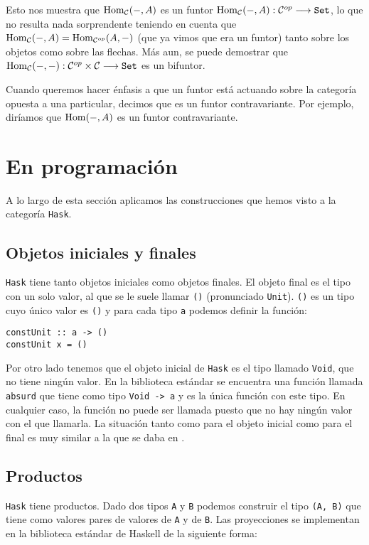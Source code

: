 Esto nos muestra que $\operatorname{Hom}_{\mathcal{C}}(-, A)$ es un funtor
$\operatorname{Hom}_{\mathcal{C}}(-, A) : \mathcal{C}^{op}\longrightarrow \texttt{Set}$, lo que no resulta
nada sorprendente teniendo en cuenta que
$\operatorname{Hom}_{\mathcal{C}}(-, A) = \operatorname{Hom}_{\mathcal{C}^{op}}(A, -)$ (que ya vimos que
era un funtor) tanto sobre los objetos
como sobre las flechas. Más aun, se puede demostrar
que $\operatorname{Hom}_{\mathcal{C}}(-, -) : \mathcal{C}^{op} \times \mathcal{C}\longrightarrow \texttt{Set}$ es un bifuntor.

Cuando queremos hacer énfasis a que un funtor está actuando sobre
la categoría opuesta a una particular, decimos que es un funtor
contravariante. Por ejemplo, diríamos que $\operatorname{Hom}(-, A)$ es un funtor
contravariante.

\section{En programación}
A lo largo de esta sección aplicamos las construcciones que hemos visto
a la categoría \texttt{Hask}.

\subsection{Objetos iniciales y finales}
\texttt{Hask} tiene tanto objetos iniciales como objetos finales. El
objeto final es el tipo con un solo valor, al que se le suele llamar
\texttt{()} (pronunciado \texttt{Unit}). \texttt{()} es un tipo
cuyo único valor es \texttt{()} y para cada tipo \texttt{a} podemos
definir la función:
\begin{verbatim}
constUnit :: a -> ()
constUnit x = ()
\end{verbatim}
Por otro lado tenemos que el objeto inicial de \texttt{Hask} es el tipo
llamado \texttt{Void}, que no tiene ningún valor. En la biblioteca
estándar se encuentra una función llamada \texttt{absurd}
que tiene
como tipo \texttt{Void -> a} y es la única función con este tipo.
En cualquier caso, la función no puede ser llamada puesto que no
hay ningún valor con el que llamarla. La situación tanto como para
el objeto inicial como para el final es muy similar a la que se daba
en \Set.

\subsection{Productos}
\texttt{Hask} tiene productos. Dado dos tipos \texttt{A} y
\texttt{B} podemos construir el tipo \texttt{(A, B)} que tiene
como valores pares de valores de \texttt{A} y de \texttt{B}.
Las proyecciones se implementan en la biblioteca estándar de
Haskell de la siguiente forma:

